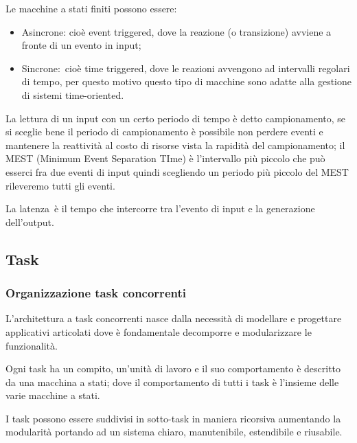 \documentclass[
]{article}
\providecommand{\tightlist}{%
  \setlength{\itemsep}{0pt}\setlength{\parskip}{0pt}}
\begin{document}
{Le macchine a stati finiti possono essere:}

\begin{itemize}
\tightlist
\item
  {Asincrone}{: cioè event triggered, dove la reazione (o transizione)
  avviene a fronte di un evento in input;}
\end{itemize}

{}

\begin{itemize}
\tightlist
\item
  {Sincrone:}{~cioè time triggered, dove le reazioni avvengono ad
  intervalli regolari di tempo, per questo motivo questo tipo di
  macchine sono adatte alla gestione di sistemi time-oriented.}
\end{itemize}

{La lettura di un input con un certo periodo di tempo è detto
}{campionamento}{, se si sceglie bene il periodo di campionamento è
possibile non perdere eventi e mantenere la reattività al costo di
risorse vista la rapidità del campionamento; il }{MEST }{(Minimum Event
Separation TIme) è l'intervallo più piccolo che può esserci fra due
eventi di input quindi }{scegliend}{o un periodo più piccolo del MEST
rileveremo tutti gli eventi.}

{La }{latenza}{~è il tempo che intercorre tra l'evento di input e la
generazione dell'output.}

{}

\subsection{\texorpdfstring{{Task}}{Task}}\label{h.9smmjrc0r4nj}

\subsubsection{\texorpdfstring{{Organizzazione task
concorrenti}}{Organizzazione task concorrenti}}\label{h.1x7xymhf3eif}

{L'architettura a task concorrenti nasce dalla necessità di modellare e
progettare applicativi articolati dove è fondamentale decomporre e
modularizzare le funzionalità.}

{Ogni task ha un compito, un'unità di lavoro e il suo comportamento è
descritto da una macchina a stati; dove il comportamento di tutti i task
è l'insieme delle varie macchine a stati.}

{}

{I task possono essere suddivisi in sotto-task in maniera ricorsiva
aumentando la modularità portando ad un sistema chiaro, manutenibile,
estendibile e riusabile.}
\end{document}
